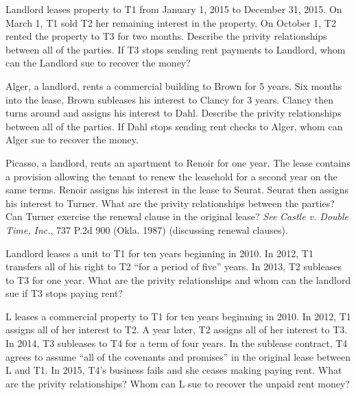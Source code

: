 
\item Landlord leases property to T1 from January 1, 2015 to December 31, 2015. 
On March 1, T1 sold T2 her remaining interest in the property.  On October 1,
T2 rented the property to T3 for two months.  Describe the privity
relationships between all of the parties.  If T3 stops sending rent payments to
Landlord, whom can the Landlord sue to recover the money? 


\item Alger, a landlord, rents a commercial building to Brown for 5 years.  Six
months into the lease, Brown subleases his interest to Clancy for 3 years. 
Clancy then turns around and assigns his interest to Dahl.  Describe the
privity relationships between all of the parties.  If Dahl stops sending rent
checks to Alger, whom can Alger sue to recover the money.


\item Picasso, a landlord, rents an apartment to Renoir for one year.  The lease
contains a provision allowing the tenant to renew the leasehold for a second
year on the same terms.  Renoir assigns his interest in the lease to Seurat. 
Seurat then assigns his interest to Turner.  What are the privity relationships
between the parties? Can Turner exercise the renewal clause in the original
lease? \textit{See} \textit{Castle v. Double Time, Inc.}, 737 P.2d 900 (Okla.
1987) (discussing renewal clauses). 


\item Landlord leases a unit to T1 for ten years beginning in 2010.  In 2012, T1
transfers all of his right to T2 ``for a period of five'' years.  In 2013, T2
subleases to T3 for one year.  What are the privity relationships and whom can
the landlord sue if T3 stops paying rent?


\item L leases a commercial property to T1 for ten years beginning in 2010.  In
2012, T1 assigns all of her interest to T2.  A year later, T2 assigns all of
her interest to T3.  In 2014, T3 subleases to T4 for a term of four years.  In
the sublease contract, T4 agrees to assume ``all of the covenants and
promises'' in the original lease between L and T1.  In 2015, T4's business
fails and she ceases making paying rent.  What are the privity relationships? 
Whom can L sue to recover the unpaid rent money?  

